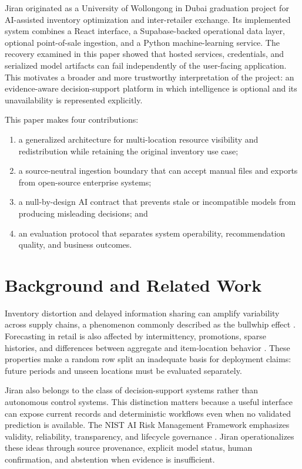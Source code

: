 \documentclass[graybox]{svmult}
\begin{document}
Jiran originated as a University of Wollongong in Dubai graduation project for AI-assisted inventory optimization and inter-retailer exchange. Its implemented system combines a React interface, a Supabase-backed operational data layer, optional point-of-sale ingestion, and a Python machine-learning service. The recovery examined in this paper showed that hosted services, credentials, and serialized model artifacts can fail independently of the user-facing application. This motivates a broader and more trustworthy interpretation of the project: an evidence-aware decision-support platform in which intelligence is optional and its unavailability is represented explicitly.

This paper makes four contributions:
\begin{enumerate}
\item a generalized architecture for multi-location resource visibility and redistribution while retaining the original inventory use case;
\item a source-neutral ingestion boundary that can accept manual files and exports from open-source enterprise systems;
\item a null-by-design AI contract that prevents stale or incompatible models from producing misleading decisions; and
\item an evaluation protocol that separates system operability, recommendation quality, and business outcomes.
\end{enumerate}

\section{Background and Related Work}
Inventory distortion and delayed information sharing can amplify variability across supply chains, a phenomenon commonly described as the bullwhip effect \cite{lee1997}. Forecasting in retail is also affected by intermittency, promotions, sparse histories, and differences between aggregate and item-location behavior \cite{syntetos2005,fildes2019}. These properties make a random row split an inadequate basis for deployment claims: future periods and unseen locations must be evaluated separately.

Jiran also belongs to the class of decision-support systems rather than autonomous control systems. This distinction matters because a useful interface can expose current records and deterministic workflows even when no validated prediction is available. The NIST AI Risk Management Framework emphasizes validity, reliability, transparency, and lifecycle governance \cite{nist2023}. Jiran operationalizes these ideas through source provenance, explicit model status, human confirmation, and abstention when evidence is insufficient.
\end{document}
